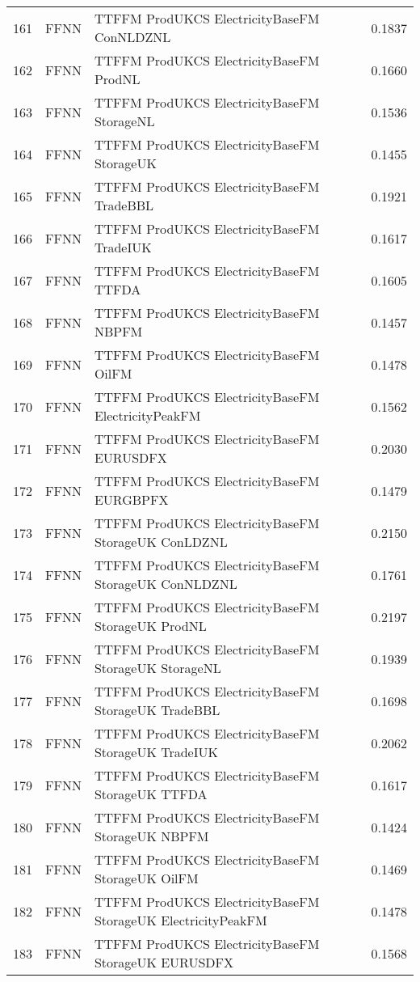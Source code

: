 \begin{table}[ht]
\begin{tabular}{rllr}
  161 & FFNN & TTFFM ProdUKCS ElectricityBaseFM ConNLDZNL & 0.1837 \\ 
  162 & FFNN & TTFFM ProdUKCS ElectricityBaseFM ProdNL & 0.1660 \\ 
  163 & FFNN & TTFFM ProdUKCS ElectricityBaseFM StorageNL & 0.1536 \\ 
  164 & FFNN & TTFFM ProdUKCS ElectricityBaseFM StorageUK & 0.1455 \\ 
  165 & FFNN & TTFFM ProdUKCS ElectricityBaseFM TradeBBL & 0.1921 \\ 
  166 & FFNN & TTFFM ProdUKCS ElectricityBaseFM TradeIUK & 0.1617 \\ 
  167 & FFNN & TTFFM ProdUKCS ElectricityBaseFM TTFDA & 0.1605 \\ 
  168 & FFNN & TTFFM ProdUKCS ElectricityBaseFM NBPFM & 0.1457 \\ 
  169 & FFNN & TTFFM ProdUKCS ElectricityBaseFM OilFM & 0.1478 \\ 
  170 & FFNN & TTFFM ProdUKCS ElectricityBaseFM ElectricityPeakFM & 0.1562 \\ 
  171 & FFNN & TTFFM ProdUKCS ElectricityBaseFM EURUSDFX & 0.2030 \\ 
  172 & FFNN & TTFFM ProdUKCS ElectricityBaseFM EURGBPFX & 0.1479 \\ 
  173 & FFNN & TTFFM ProdUKCS ElectricityBaseFM StorageUK ConLDZNL & 0.2150 \\ 
  174 & FFNN & TTFFM ProdUKCS ElectricityBaseFM StorageUK ConNLDZNL & 0.1761 \\ 
  175 & FFNN & TTFFM ProdUKCS ElectricityBaseFM StorageUK ProdNL & 0.2197 \\ 
  176 & FFNN & TTFFM ProdUKCS ElectricityBaseFM StorageUK StorageNL & 0.1939 \\ 
  177 & FFNN & TTFFM ProdUKCS ElectricityBaseFM StorageUK TradeBBL & 0.1698 \\ 
  178 & FFNN & TTFFM ProdUKCS ElectricityBaseFM StorageUK TradeIUK & 0.2062 \\ 
  179 & FFNN & TTFFM ProdUKCS ElectricityBaseFM StorageUK TTFDA & 0.1617 \\ 
  180 & FFNN & TTFFM ProdUKCS ElectricityBaseFM StorageUK NBPFM & 0.1424 \\ 
  181 & FFNN & TTFFM ProdUKCS ElectricityBaseFM StorageUK OilFM & 0.1469 \\ 
  182 & FFNN & TTFFM ProdUKCS ElectricityBaseFM StorageUK ElectricityPeakFM & 0.1478 \\ 
  183 & FFNN & TTFFM ProdUKCS ElectricityBaseFM StorageUK EURUSDFX & 0.1568 \\ 

\end{tabular}
\end{table}
